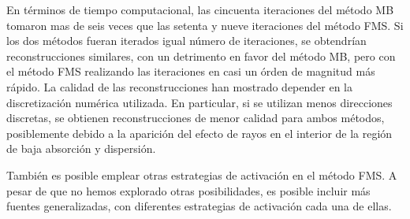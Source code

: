 En términos de tiempo computacional, las cincuenta iteraciones del método 
MB tomaron mas de seis veces que las setenta y nueve iteraciones del 
método FMS. Si los dos métodos fueran iterados igual número de iteraciones, 
se obtendrían reconstrucciones similares, con un detrimento en favor 
del método MB, pero con el método FMS realizando las iteraciones en casi un órden 
de magnitud más rápido. La calidad de las reconstrucciones han mostrado 
depender en la discretización numérica utilizada. En particular, 
si se utilizan menos direcciones discretas, se obtienen 
reconstrucciones de menor calidad para ambos métodos, 
posiblemente debido a la aparición del efecto de rayos 
en el interior de la región de baja absorción y dispersión. 

También es posible emplear otras estrategias de activación en el método 
FMS. A pesar de que no hemos explorado otras posibilidades, 
es posible incluir más fuentes generalizadas, con diferentes 
estrategias de activación cada una de ellas. 



